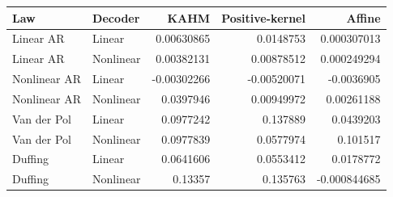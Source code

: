 \begin{tabular}{llrrr}
\toprule
Law & Decoder & KAHM & Positive-kernel & Affine \\
\midrule
Linear AR & Linear & 0.00630865 & 0.0148753 & 0.000307013 \\
Linear AR & Nonlinear & 0.00382131 & 0.00878512 & 0.000249294 \\
Nonlinear AR & Linear & -0.00302266 & -0.00520071 & -0.0036905 \\
Nonlinear AR & Nonlinear & 0.0397946 & 0.00949972 & 0.00261188 \\
Van der Pol & Linear & 0.0977242 & 0.137889 & 0.0439203 \\
Van der Pol & Nonlinear & 0.0977839 & 0.0577974 & 0.101517 \\
Duffing & Linear & 0.0641606 & 0.0553412 & 0.0178772 \\
Duffing & Nonlinear & 0.13357 & 0.135763 & -0.000844685 \\
\bottomrule
\end{tabular}
